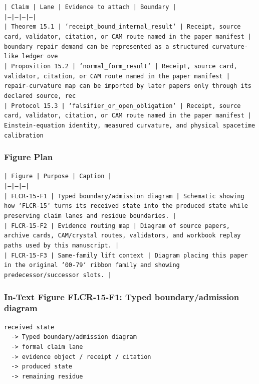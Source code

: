 \documentclass[11pt]{article}
\begin{document}
\noindent\texttt{| Claim | Lane | Evidence to attach | Boundary |}\\
\noindent\texttt{|---|---|---|---|}\\
\noindent\texttt{| Theorem 15.1 | `receipt\_bound\_internal\_result` | Receipt, source card, validator, citation, or CAM route named in the paper manifest | boundary repair demand can be represented as a structured curvature-like ledger ove}\\
\noindent\texttt{| Proposition 15.2 | `normal\_form\_result` | Receipt, source card, validator, citation, or CAM route named in the paper manifest | repair-curvature map can be imported by later papers only through its declared source, rec}\\
\noindent\texttt{| Protocol 15.3 | `falsifier\_or\_open\_obligation` | Receipt, source card, validator, citation, or CAM route named in the paper manifest | Einstein-equation identity, measured curvature, and physical spacetime calibration }\\

\subsubsection*{Figure Plan}

\noindent\texttt{| Figure | Purpose | Caption |}\\
\noindent\texttt{|---|---|---|}\\
\noindent\texttt{| FLCR-15-F1 | Typed boundary/admission diagram | Schematic showing how `FLCR-15` turns its received state into the produced state while preserving claim lanes and residue boundaries. |}\\
\noindent\texttt{| FLCR-15-F2 | Evidence routing map | Diagram of source papers, archive cards, CAM/crystal routes, validators, and workbook replay paths used by this manuscript. |}\\
\noindent\texttt{| FLCR-15-F3 | Same-family lift context | Diagram placing this paper in the original `00-79` ribbon family and showing predecessor/successor slots. |}\\

\subsubsection*{In-Text Figure FLCR-15-F1: Typed boundary/admission diagram}

\begin{verbatim}
received state
  -> Typed boundary/admission diagram
  -> formal claim lane
  -> evidence object / receipt / citation
  -> produced state
  -> remaining residue
\end{verbatim}
\end{document}
